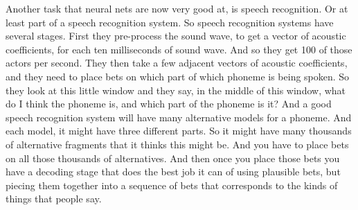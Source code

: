 \begin{multicols}{2}
\begin{footnotesize}
Another task that neural nets are now very good at, is speech recognition. Or at least part of a speech recognition system. So speech recognition systems have several stages. First they pre-process the sound wave, to get a vector of acoustic coefficients, for each ten milliseconds of sound wave. And so they get 100 of those actors per second. They then take a few adjacent vectors of acoustic coefficients, and they need to place bets on which part of which phoneme is being spoken. So they look at this little window and they say, in the middle of this window, what do I think the phoneme is, and which part of the phoneme is it? And a good speech recognition system will have many alternative models for a phoneme. And each model, it might have three different parts. So it might have many thousands of alternative fragments that it thinks this might be. And you have to place bets on all those thousands of alternatives. And then once you place those bets you have a decoding stage that does the best job it can of using plausible bets, but piecing them together into a sequence of bets that corresponds to the kinds of things that people say.


\end{footnotesize}
\end{multicols}
